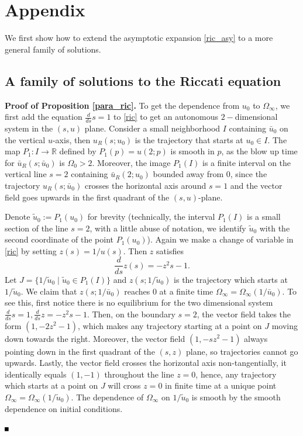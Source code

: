 \documentclass[letterpaper,11pt]{article}
\numberwithin{equation}{section}
\theoremstyle{plain}
\newenvironment{Proof}[1][\unskip]%
 {\begin{trivlist} \item[]{\bf Proof #1. }}%
 {\hspace*{\fill}$\rule{.4\baselineskip}{.4\baselineskip}$\end{trivlist}}
\begin{document}
\section*{Appendix}
\renewcommand{\thesubsection}{\Alph{subsection}}
We first show how to extend the asymptotic expansion \eqref{ric_asy} to a more general family of solutions.
\subsection{A family of solutions to the Riccati equation }


\begin{Proof}[\textbf{ of Proposition \ref{para_ric}}] To get the dependence from $u_0$ to $\Omega_\infty$, we first add the equation $\frac{d}{ds}s=1$ to \eqref{ric} to get an autonomous $2-$dimensional system in the $(s,u)$ plane. Consider a small neighborhood $I$ containing $\bar{u}_0$ on the vertical $u$-axis, then $u_R(s; u_0)$ is the trajectory that starts at $u_0 \in I$. The map $P_1 : I \to \mathbb{R}$ defined by $P_1(p) = u(2; p)$ is smooth in $p$, as the blow up time for $\bar{u}_R(s;\bar{u}_0)$ is $\Omega_0 >2$. Moreover, the image $P_1(I)$ is a finite interval on the vertical line $s=2$ containing $\bar{u}_R(2;u_0)$ bounded away from $0$, since the trajectory $u_R(s;\bar{u}_0)$ crosses the horizontal axis around $s=1$ and the vector field goes upwards in the first quadrant of the $(s,u)$-plane.

Denote $\tilde{u}_0:= P_1(u_0)$ for brevity (technically, the interval $P_1(I)$ is a small section of the line $s=2$, with a little abuse of notation, we identify $\tilde{u}_0$ with the second coordinate of the point $P_1(u_0)$). Again we make a change of variable in \eqref{ric} by setting $z(s) = 1/u(s)$. Then $z$ satisfies 
\[
\frac{d}{ds}z(s) = -z^2s -1.
\]
Let $J = \{ 1/\tilde{u}_0 \mid  \tilde{u}_0 \in P_1(I)\}$ and $z(s; 1/\tilde{u}_0)$ is the trajectory which starts at $1/\tilde{u}_0$. We claim that $z(s; 1/\bar{u}_0)$ reaches $0$ at a finite time $\Omega_\infty = \Omega_\infty(1/\bar{u}_0)$. To see this, first notice there is no equilibrium for the two dimensional system $\frac{d}{ds}s=1, \frac{d}{ds}z=-z^2s-1$. Then, on the boundary $s=2$, the vector field takes the form $(1,-2z^2-1)$, which makes any trajectory starting at a point on $J$ moving down towards the right. Moreover, the vector field $(1,-sz^2-1)$ always pointing down in the first quadrant of the $(s,z)$ plane, so trajectories cannot go upwards. Lastly, the vector field crosses the horizontal axis non-tangentially, it identically equals $(1,-1)$ throughout the line $z=0$, hence, any trajectory which starts at a point on $J$ will cross $z=0$ in finite time at a unique point $\Omega_\infty = \Omega_\infty(1/\tilde{u}_0)$. The dependence of $\Omega_\infty$ on $1/\tilde{u}_0$ is smooth by the smooth dependence on initial conditions.


\end{Proof}
\end{document}

